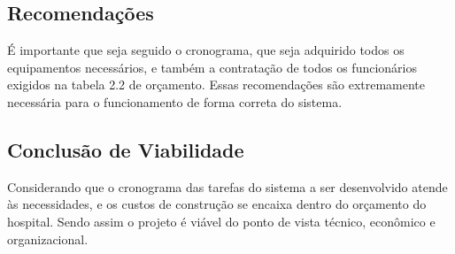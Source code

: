        \subsection{Recomenda\c{c}\~{o}es}
       É importante que seja seguido o cronograma, que seja adquirido todos os equipamentos necessários, e também a contratação de todos os funcionários exigidos na tabela 2.2 de orçamento. Essas recomendações são extremamente necessária para o funcionamento de forma correta do sistema.
       \subsection{Conclus\~{a}o de Viabilidade}
       Considerando que o cronograma das tarefas do sistema a ser desenvolvido atende às necessidades, e os custos de construção se encaixa dentro do orçamento do hospital. Sendo assim o projeto é viável do ponto de vista técnico, econômico e organizacional.